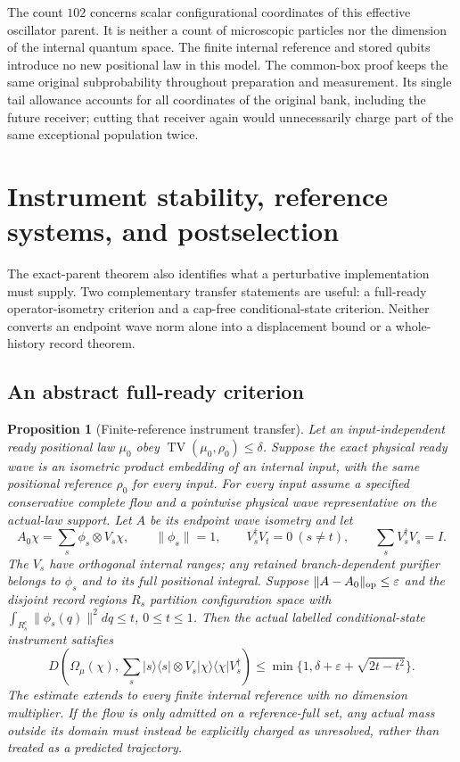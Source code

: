 \documentclass[11pt]{article}
\numberwithin{equation}{section}
\newtheorem{proposition}[theorem]{Proposition}
\theoremstyle{definition}
\theoremstyle{remark}
\begin{document}
The count $102$ concerns scalar configurational coordinates of this
effective oscillator parent. It is neither a count of microscopic
particles nor the dimension of the internal quantum space. The finite
internal reference and stored qubits introduce no new positional law
in this model. The common-box proof keeps the same original
subprobability throughout preparation and measurement. Its single tail
allowance accounts for all coordinates of the original bank, including
the future receiver; cutting that receiver again would unnecessarily
charge part of the same exceptional population twice.

\section{Instrument stability, reference systems, and postselection}
\label{p1i:sec:stability}

The exact-parent theorem also identifies what a perturbative
implementation must supply. Two complementary transfer statements are
useful: a full-ready operator-isometry criterion and a cap-free
conditional-state criterion. Neither converts an endpoint wave norm
alone into a displacement bound or a whole-history record theorem.

\subsection{An abstract full-ready criterion}

\begin{proposition}[Finite-reference instrument transfer]
\label{p1i:prop:abstract}
Let an input-independent ready positional law $\mu_0$ obey
$\operatorname{TV}(\mu_0,\rho_0)\leq\delta$. Suppose the exact physical
ready wave is an isometric product embedding of an internal input, with
the same positional reference $\rho_0$ for every input. For every input
assume a specified conservative complete flow and a pointwise physical
wave representative on the actual-law support. Let $A$ be its endpoint
wave isometry and let
\[
 A_0\chi=\sum_s\phi_s\otimes V_s\chi,
 \qquad \|\phi_s\|=1,
 \qquad V_s^\dagger V_t=0\ (s\ne t),
 \qquad\sum_s V_s^\dagger V_s=I.
\]
The $V_s$ have orthogonal internal ranges; any retained branch-dependent
purifier belongs to $\phi_s$ and to its full positional integral.
Suppose $\|A-A_0\|_{\rm op}\leq\varepsilon$ and the disjoint record
regions $R_s$ partition configuration space with
$\int_{R_s^c}\|\phi_s(q)\|^2dq\leq t$, $0\leq t\leq1$.
Then the actual labelled conditional-state instrument satisfies
\begin{equation}\label{p1i:eq:abstract}
 D\!\left(\Omega_\mu(\chi),
       \sum_s|s\rangle\langle s|\otimes
            V_s|\chi\rangle\langle\chi|V_s^\dagger\right)
 \leq\min\{1,\delta+\varepsilon+\sqrt{2t-t^2}\}.
\end{equation}
The estimate extends to every finite internal reference with no
dimension multiplier. If the flow is only admitted on a reference-full
set, any actual mass outside its domain must instead be explicitly
charged as unresolved, rather than treated as a predicted trajectory.
\end{proposition}
\end{document}
